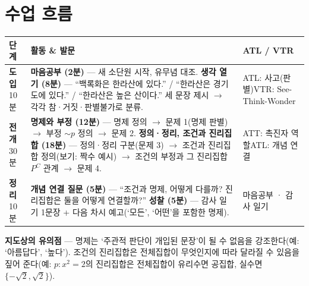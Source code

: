 \documentclass[11pt,a4paper]{article}
\begin{document}
\section{수업 흐름}
\begin{tabularx}{\linewidth}{@{}>{\centering\arraybackslash}p{1.6cm}X>{\raggedright\arraybackslash\small}p{3.1cm}@{}}
\toprule
\textbf{단계} & \textbf{활동 \& 발문} & \textbf{ATL / VTR} \\
\midrule
\textcolor{goldstrong}{\textbf{도입}}\newline\footnotesize 10분 &
\textbf{마음공부 (2분)} --- 새 소단원 시작, 유무념 대조.\newline
\textbf{생각 열기 (8분)} --- ``백록화은 한라산에 있다.'' / ``한라산은 경기도에 있다.'' / ``한라산은 높은 산이다.'' 세 문장 제시 $\to$ 각각 참·거짓·판별불가로 분류. &
ATL: 사고(판별)\newline VTR: See-Think-Wonder \\
\addlinespace
\textcolor{goldstrong}{\textbf{전개}}\newline\footnotesize 30분 &
\textbf{명제와 부정 (12분)} --- 명제 정의 $\to$ 문제 1(명제 판별) $\to$ 부정 $\sim p$ 정의 $\to$ 문제 2.\newline
\textbf{정의·정리, 조건과 진리집합 (18분)} --- 정의·정리 구분(문제 3) $\to$ 조건과 진리집합 정의(보기: 짝수 예시) $\to$ 조건의 부정과 그 진리집합 $P^C$ 관계 $\to$ 문제 4. &
ATT: 촉진자 역할\newline ATL: 개념 연결 \\
\addlinespace
\textcolor{goldstrong}{\textbf{정리}}\newline\footnotesize 10분 &
\textbf{개념 연결 질문 (5분)} --- ``조건과 명제, 어떻게 다를까? 진리집합은 둘을 어떻게 연결할까?''\newline
\textbf{성찰 (5분)} --- 감사 일기 1문장 + 다음 차시 예고(`모든', `어떤'을 포함한 명제). &
마음공부 · 감사 일기 \\
\bottomrule
\end{tabularx}

\begin{calloutbox}
\textbf{지도상의 유의점} --- 명제는 `주관적 판단이 개입된 문장'이 될 수 없음을 강조한다(예: `아름답다', `높다'). 조건의 진리집합은 전체집합이 무엇인지에 따라 달라질 수 있음을 짚어 준다(예: $p:x^2=2$의 진리집합은 전체집합이 유리수면 공집합, 실수면 $\{-\sqrt2,\sqrt2\}$).
\end{calloutbox}
\end{document}

